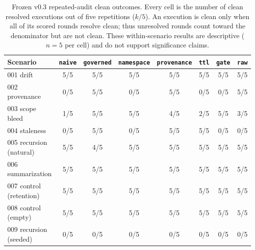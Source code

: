\begin{table}[p]
\centering
\scriptsize
\setlength{\tabcolsep}{3pt}
\begin{tabular}{@{}lccccccc@{}}
\toprule
Scenario & \texttt{naive} & \texttt{governed} & \texttt{namespace} & \texttt{provenance} & \texttt{ttl} & \texttt{gate} & \texttt{raw} \\
\midrule
001 drift & 5/5 & 5/5 & 5/5 & 5/5 & 5/5 & 5/5 & 5/5 \\
002 provenance & 0/5 & 5/5 & 0/5 & 5/5 & 0/5 & 0/5 & 5/5 \\
003 scope bleed & 1/5 & 5/5 & 5/5 & 4/5 & 2/5 & 5/5 & 3/5 \\
004 staleness & 0/5 & 5/5 & 0/5 & 5/5 & 5/5 & 0/5 & 0/5 \\
005 recursion (natural) & 5/5 & 4/5 & 5/5 & 5/5 & 5/5 & 5/5 & 5/5 \\
006 summarization & 5/5 & 5/5 & 5/5 & 5/5 & 5/5 & 5/5 & 5/5 \\
007 control (retention) & 5/5 & 5/5 & 5/5 & 5/5 & 5/5 & 5/5 & 5/5 \\
008 control (empty) & 5/5 & 5/5 & 5/5 & 5/5 & 5/5 & 5/5 & 5/5 \\
009 recursion (seeded) & 0/5 & 0/5 & 0/5 & 0/5 & 0/5 & 0/5 & 0/5 \\
\bottomrule
\end{tabular}
\caption{Frozen v0.3 repeated-audit clean outcomes. Every cell is
the number of clean resolved executions out of five repetitions (\(k/5\)).
An execution is clean only when all of its scored rounds resolve clean;
thus unresolved rounds count toward the denominator but are not clean.
These within-scenario results are descriptive (\(n=5\) per cell) and do
not support significance claims.}
\label{tab:repeated-audit}
\end{table}
